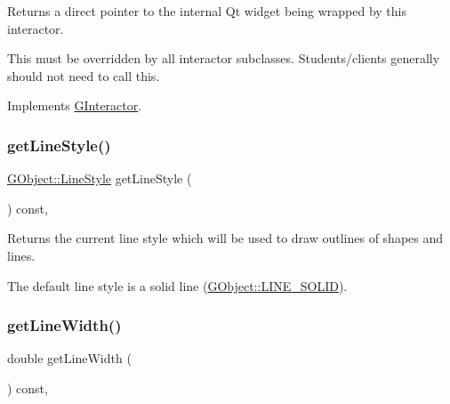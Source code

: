 Returns a direct pointer to the internal Qt widget being wrapped by this interactor. 

This must be overridden by all interactor subclasses. Students/clients generally should not need to call this. 

Implements \mbox{\hyperlink{classsgl_1_1GInteractor}{G\+Interactor}}.

\mbox{\label{classsgl_1_1GDrawingSurface_aaf1f5ea8281e5e3486662878d26f0a13}} 
\subsubsection{\texorpdfstring{get\+Line\+Style()}{getLineStyle()}}
{\footnotesize\ttfamily \mbox{\hyperlink{classsgl_1_1GObject_a86e0f5648542856159bb40775c854aa7}{G\+Object\+::\+Line\+Style}} get\+Line\+Style (\begin{DoxyParamCaption}{ }\end{DoxyParamCaption}) const\hspace{0.3cm}{\ttfamily [virtual]}, {\ttfamily [inherited]}}



Returns the current line style which will be used to draw outlines of shapes and lines. 

The default line style is a solid line (\mbox{\hyperlink{classsgl_1_1GObject_a86e0f5648542856159bb40775c854aa7a700c78bc2cd76acaab26651bf7b4941f}{G\+Object\+::\+L\+I\+N\+E\+\_\+\+S\+O\+L\+ID}}). \mbox{\label{classsgl_1_1GDrawingSurface_a85ff266dc3eb63d9f2d8e5a4487fd3c0}} 
\subsubsection{\texorpdfstring{get\+Line\+Width()}{getLineWidth()}}
{\footnotesize\ttfamily double get\+Line\+Width (\begin{DoxyParamCaption}{ }\end{DoxyParamCaption}) const\hspace{0.3cm}{\ttfamily [virtual]}, {\ttfamily [inherited]}}



